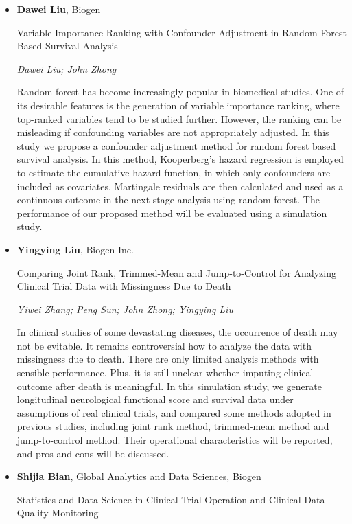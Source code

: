 \begin{itemize}
\item \textbf{Dawei Liu}, Biogen

Variable Importance Ranking with Confounder-Adjustment in Random Forest Based Survival Analysis

\emph{\footnotesize Dawei Liu; John Zhong}

Random forest has become increasingly popular in biomedical studies. One of its desirable features is the generation of variable importance ranking, where top-ranked variables tend to be studied further. However, the ranking can be misleading if confounding variables are not appropriately adjusted. In this study we propose a confounder adjustment method for random forest based survival analysis.   In this method, Kooperberg’s hazard regression is employed to estimate the cumulative hazard function, in which only confounders are included as covariates. Martingale residuals are then calculated and used as a continuous outcome in the next stage analysis using random forest. The performance of our proposed method will be evaluated using a simulation study.

\item \textbf{Yingying Liu}, Biogen Inc.

Comparing Joint Rank, Trimmed-Mean and Jump-to-Control for Analyzing Clinical Trial Data with Missingness Due to Death

\emph{\footnotesize Yiwei Zhang; Peng Sun;  John Zhong; Yingying Liu}

In clinical studies of some devastating diseases, the occurrence of death may not be evitable. It remains controversial how to analyze the data with missingness due to death. There are only limited analysis methods with sensible performance. Plus, it is still unclear whether imputing clinical outcome after death is meaningful. In this simulation study, we generate longitudinal neurological functional score and survival data under assumptions of real clinical trials, and compared some methods adopted in previous studies, including joint rank method, trimmed-mean method and jump-to-control method. Their operational characteristics will be reported, and pros and cons will be discussed.

\item \textbf{Shijia Bian}, Global Analytics and Data Sciences, Biogen

Statistics and Data Science in Clinical Trial Operation and Clinical Data Quality Monitoring


\end{itemize}
